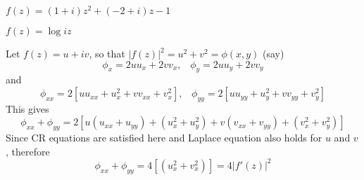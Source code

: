 \begin{Solution}{2.5}
$f(z)=(1+i)z^2 + (-2+i)z-1$
\end{Solution}
\begin{Solution}{2.6}
$f(z)=\log iz$
\end{Solution}
\begin{Solution}{2.7}
Let $f(z)=u+iv$, so that $|f(z)|^2=u^2+v^2 = \phi(x,y)$ (say)
\[\phi_x = 2uu_x + 2vv_x,\;\;\;\phi_y = 2uu_y + 2vv_y\]
and
\[\phi_{xx} = 2\left[uu_{xx} + u_x^2 + vv_{xx} + v_x^2\right],\;\;\;\phi_{yy} =  2\left[uu_{yy} + u_y^2 + vv_{yy} + v_y^2\right]\]
This gives
\[\phi_{xx} + \phi_{yy} =  2\left[u(u_{xx}+u_{yy}) + (u_x^2 + u_y^2) + v(v_{xx}+v_{yy}) + (v_x^2+v_y^2)\right] \]
Since CR equations are satisfied here and Laplace equation also holds for $u$ and $v$, therefore
\[\phi_{xx} + \phi_{yy} =  4\left[(u_x^2 + v_x^2) \right]  = 4 |f'(z)|^2\]
\end{Solution}
